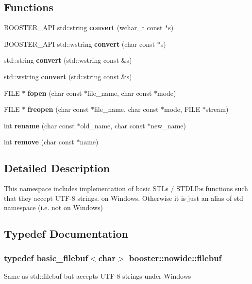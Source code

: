 \subsection*{Functions}
\begin{DoxyCompactItemize}
\item 
B\+O\+O\+S\+T\+E\+R\+\_\+\+A\+PI std\+::string {\bf convert} (wchar\+\_\+t const $\ast$s)
\item 
B\+O\+O\+S\+T\+E\+R\+\_\+\+A\+PI std\+::wstring {\bf convert} (char const $\ast$s)
\item 
std\+::string {\bf convert} (std\+::wstring const \&s)
\item 
std\+::wstring {\bf convert} (std\+::string const \&s)
\item 
F\+I\+LE $\ast$ {\bf fopen} (char const $\ast$file\+\_\+name, char const $\ast$mode)
\item 
F\+I\+LE $\ast$ {\bf freopen} (char const $\ast$file\+\_\+name, char const $\ast$mode, F\+I\+LE $\ast$stream)
\item 
int {\bf rename} (char const $\ast$old\+\_\+name, char const $\ast$new\+\_\+name)
\item 
int {\bf remove} (char const $\ast$name)
\end{DoxyCompactItemize}


\subsection{Detailed Description}
This namespace includes implementation of basic S\+TL\textquotesingle{}s / S\+T\+D\+L\+Ib\textquotesingle{}s functions such that they accept U\+T\+F-\/8 strings. on Windows. Otherwise it is just an alias of std namespace (i.\+e. not on Windows) 

\subsection{Typedef Documentation}
\subsubsection[{filebuf}]{\setlength{\rightskip}{0pt plus 5cm}typedef {\bf basic\+\_\+filebuf}$<$char$>$ {\bf booster\+::nowide\+::filebuf}}\label{namespacebooster_1_1nowide_af9a3f7aff0f973ee8d6782afcc3e9093}
Same as std\+::filebuf but accepts U\+T\+F-\/8 strings under Windows 
